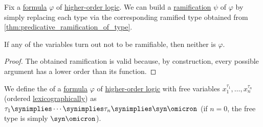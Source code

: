 \begin{proposition}\label{thm:predicative_ramification_of_formula}
  Fix a \hyperref[def:hol_expression/formula]{formula} \( \varphi \) of \hyperref[def:higher_order_logic]{higher-order logic}. We can build a \hyperref[def:ramified_theory_of_types/formulas]{ramification} \( \psi \) of \( \varphi \) by simply replacing each type via the corresponding ramified type obtained from \cref{thm:predicative_ramification_of_type}.

  If any of the variables turn out not to be ramifiable, then neither is \( \varphi \).
\end{proposition}
\begin{proof}
  The obtained ramification is valid because, by construction, every possible argument has a lower order than its function.
\end{proof}

\begin{definition}\label{def:hol_formula_free_type}\mimprovised
  We define the  of a \hyperref[def:hol_expression/formula]{formula} \( \varphi \) of \hyperref[def:higher_order_logic]{higher-order logic} with free variables \( x_1^{\tau_1}, \ldots, x_n^{\tau_n} \) (ordered \hyperref[def:lexicographic_order]{lexicographically}) as \( \tau_1 \synimplies \cdots \synimplies \tau_n \synimplies \syn\omicron \) (if \( n = 0 \), the free type is simply \( \syn\omicron \)).
\end{definition}

